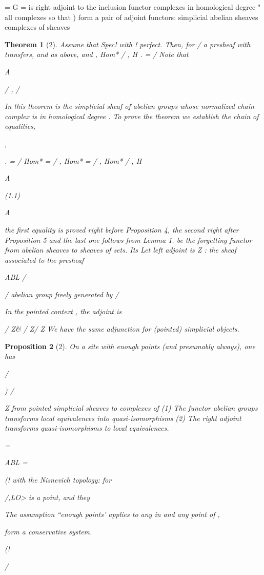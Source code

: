 \documentclass[11pt,a4paper]{article}
\theoremstyle{plain}
\newtheorem{theorem}{Theorem}
\newtheorem{proposition}[theorem]{Proposition}
\theoremstyle{definition}
\begin{document}
=  G = is right adjoint to the inclusion functor
complexes in homological degree   " all complexes
so that )  form a pair of adjoint functors:
simplicial abelian sheaves  complexes of sheaves
\begin{theorem}[2]
Assume that  Spec! with ! perfect. Then, for / a presheaf with
transfers, and  as above, and ,  
Hom*    / , H .    = / 
Note that

A 



/ ,
/

In this theorem
is the simplicial sheaf of abelian groups whose normalized
chain complex is in homological degree .
To prove the theorem we establish the chain of equalities,

,

.    = /  Hom*   = / ,
Hom*   = / , Hom*   / ,
H

A

(1.1)

A

the first equality is proved right before Proposition 4, the second right after Proposition 5 and the last one follows from Lemma 1.
be the forgetting functor from abelian sheaves to sheaves of sets. Its
Let
left adjoint is  Z : the sheaf associated to the presheaf

ABL
/

/ 
  abelian group freely generated by /

In the pointed context , the adjoint is

/   Z\& /  Z/ Z
We have the same adjunction for (pointed) simplicial objects.
\end{theorem}

\begin{proposition}[2]
On a site with enough points (and presumably always), one has

/

) / 


Z
from pointed simplicial sheaves to complexes of
(1) The functor
abelian groups transforms local equivalences into quasi-isomorphisms
(2) The right adjoint 
transforms quasi-isomorphisms to local
equivalences.

=

ABL =

(! with the Nisnevich topology: for

/,LO>
 is a point, and they

The assumption ``enough points' applies to
any in
and any point of ,

form a conservative system.

 (!

  /

\end{proposition}
\end{document}
